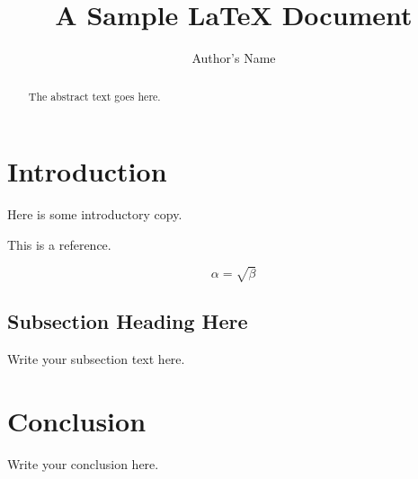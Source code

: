 \documentclass{article}
\begin{document}
\title{A Sample \LaTeX{} Document}
\author{Author's Name}

\maketitle

\begin{abstract}
The abstract text goes here.
\end{abstract}

\section{Introduction}
Here is some introductory copy.

This is a reference\cite{Flanagan2011}.

\begin{equation}
    \label{simple_equation}
    \alpha = \sqrt{ \beta }
\end{equation}

\subsection{Subsection Heading Here}
Write your subsection text here.

\section{Conclusion}
Write your conclusion here.



\end{document}
